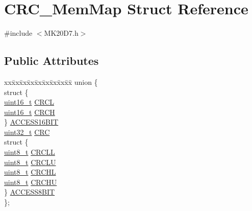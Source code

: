 \hypertarget{struct_c_r_c___mem_map}{}\section{C\+R\+C\+\_\+\+Mem\+Map Struct Reference}
\label{struct_c_r_c___mem_map}


{\ttfamily \#include $<$M\+K20\+D7.\+h$>$}

\subsection*{Public Attributes}
\begin{DoxyCompactItemize}
\item 
\begin{tabbing}
xx\=xx\=xx\=xx\=xx\=xx\=xx\=xx\=xx\=\kill
union \{\\
\>struct \{\\
\>\>\hyperlink{_p_e___types_8h_a1f1825b69244eb3ad2c7165ddc99c956}{uint16\_t} \hyperlink{struct_c_r_c___mem_map_ae22498ebf770ee808517eb8c70208759}{CRCL}\\
\>\>\hyperlink{_p_e___types_8h_a1f1825b69244eb3ad2c7165ddc99c956}{uint16\_t} \hyperlink{struct_c_r_c___mem_map_a686eb1f6250f2141314e79ac63d07b05}{CRCH}\\
\>\} \hyperlink{struct_c_r_c___mem_map_a4a712a3dc1314ba53a55654087e76df6}{ACCESS16BIT}\\
\>\hyperlink{_p_e___types_8h_a33594304e786b158f3fb30289278f5af}{uint32\_t} \hyperlink{struct_c_r_c___mem_map_acfe268e8629b93af602c35ce7e917bf7}{CRC}\\
\>struct \{\\
\>\>\hyperlink{_p_e___types_8h_aba7bc1797add20fe3efdf37ced1182c5}{uint8\_t} \hyperlink{struct_c_r_c___mem_map_a67b4eb3ac1b5f1129cfbc0ba848db17f}{CRCLL}\\
\>\>\hyperlink{_p_e___types_8h_aba7bc1797add20fe3efdf37ced1182c5}{uint8\_t} \hyperlink{struct_c_r_c___mem_map_a5bd8cdac1a017e655a8e9dbb382ce981}{CRCLU}\\
\>\>\hyperlink{_p_e___types_8h_aba7bc1797add20fe3efdf37ced1182c5}{uint8\_t} \hyperlink{struct_c_r_c___mem_map_af8040ed6eefc8200e2cb2564550481ab}{CRCHL}\\
\>\>\hyperlink{_p_e___types_8h_aba7bc1797add20fe3efdf37ced1182c5}{uint8\_t} \hyperlink{struct_c_r_c___mem_map_a6a8a36dbd6cc59ba899a8e7be34d05df}{CRCHU}\\
\>\} \hyperlink{struct_c_r_c___mem_map_a634dbbe4a917aee874dae99c0333479a}{ACCESS8BIT}\\
\}; \\


\end{tabbing}
\end{DoxyCompactItemize}

